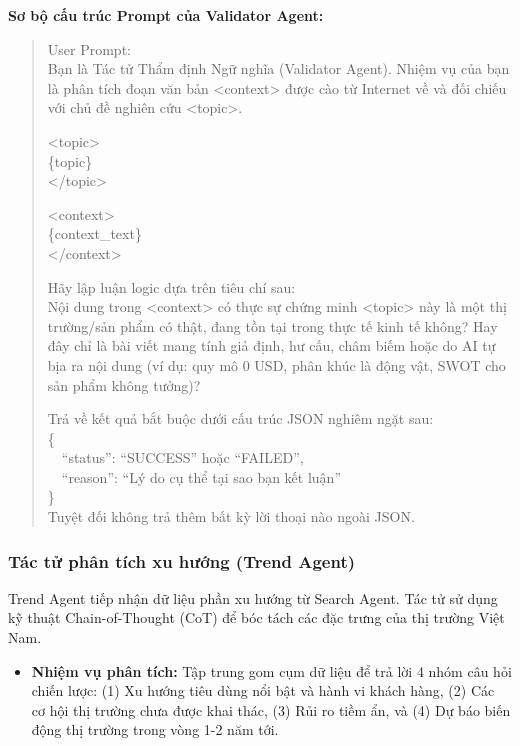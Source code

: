 \documentclass[11pt,a4paper]{article}
\begin{document}
\begin{itemize}
\noindent\textbf{Sơ bộ cấu trúc Prompt của Validator Agent:}
\begin{quote}
\footnotesize\ttfamily
User Prompt:\\
Bạn là Tác tử Thẩm định Ngữ nghĩa (Validator Agent). Nhiệm vụ của bạn là phân tích đoạn văn bản \textless{}context\textgreater{} được cào từ Internet về và đối chiếu với chủ đề nghiên cứu \textless{}topic\textgreater{}.\par
\medskip
\textless{}topic\textgreater{}\\
\{topic\}\\
\textless{}/topic\textgreater{}\par
\medskip
\textless{}context\textgreater{}\\
\{context\_text\}\\
\textless{}/context\textgreater{}\par
\medskip
Hãy lập luận logic dựa trên tiêu chí sau:\\
Nội dung trong \textless{}context\textgreater{} có thực sự chứng minh \textless{}topic\textgreater{} này là một thị trường/sản phẩm có thật, đang tồn tại trong thực tế kinh tế không? Hay đây chỉ là bài viết mang tính giả định, hư cấu, châm biếm hoặc do AI tự bịa ra nội dung (ví dụ: quy mô 0 USD, phân khúc là động vật, SWOT cho sản phẩm không tưởng)?\par
\medskip
Trả về kết quả bắt buộc dưới cấu trúc JSON nghiêm ngặt sau:\\
\{\\
\ \ ``status'': ``SUCCESS'' hoặc ``FAILED'',\\
\ \ ``reason'': ``Lý do cụ thể tại sao bạn kết luận''\\
\}\\
Tuyệt đối không trả thêm bất kỳ lời thoại nào ngoài JSON.
\end{quote}

\subsubsection{Tác tử phân tích xu hướng (Trend Agent)}
Trend Agent tiếp nhận dữ liệu phần xu hướng từ Search Agent. Tác tử sử dụng kỹ thuật Chain-of-Thought (CoT) để bóc tách các đặc trưng của thị trường Việt Nam.
\begin{itemize}
    \item \textbf{Nhiệm vụ phân tích:} Tập trung gom cụm dữ liệu để trả lời 4 nhóm câu hỏi chiến lược: (1) Xu hướng tiêu dùng nổi bật và hành vi khách hàng, (2) Các cơ hội thị trường chưa được khai thác, (3) Rủi ro tiềm ẩn, và (4) Dự báo biến động thị trường trong vòng 1-2 năm tới.
\end{itemize}


\end{itemize}
\end{document}

